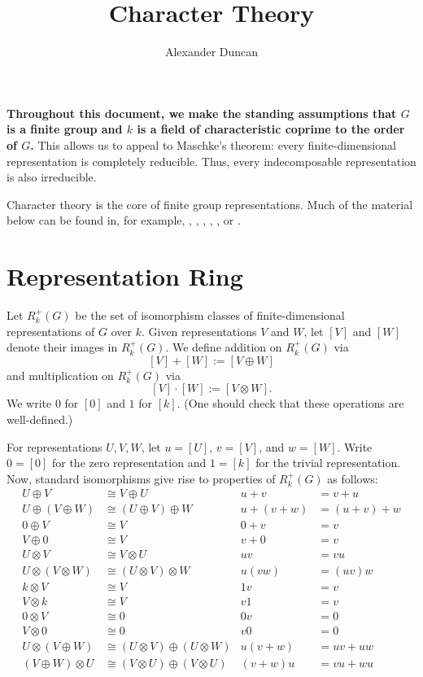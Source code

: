 \documentclass[12pt]{article}
\theoremstyle{plain}
\theoremstyle{definition}
\theoremstyle{remark}
\numberwithin{equation}{section}
\begin{document}
\title{Character Theory}
\author{Alexander Duncan}

\maketitle

{\bf
Throughout this document, we make the standing assumptions that $G$
is a finite group and $k$ is a field of characteristic coprime to the
order of $G$.}
This allows us to appeal to Maschke's theorem:
every finite-dimensional representation is completely reducible.
Thus, every indecomposable representation is also irreducible.

Character theory is the core of finite group representations.
Much of the material below can be found in, for example,
\cite[\S{14--15}]{AlperinBell},
\cite[\S{18.3}]{DF},
\cite[\S{4}]{Etingof},
\cite[\S{2}]{FultonHarris},
\cite[\S{XVIII.1--5}]{Lang}, or
\cite[\S{2}]{Serre}.

\section{Representation Ring}

Let $R^+_k(G)$ be the set of isomorphism classes of
finite-dimensional representations of $G$ over $k$.
Given representations $V$ and $W$, let $[V]$ and $[W]$ denote their
images in $R^+_k(G)$.
We define addition on $R^+_k(G)$ via
\[ [V] + [W] := [V \oplus W] \]
and multiplication on $R^+_k(G)$ via
\[ [V] \cdot [W] := [V \otimes W]. \]
We write $0$ for $[0]$ and $1$ for $[k]$.
(One should check that these operations are well-defined.)

For representations $U,V,W$, let $u=[U]$, $v=[V]$, and $w=[W]$.
Write $0 = [0]$ for the zero representation and $1=[k]$
for the trivial representation.
Now, standard isomorphisms give rise to properties of $R^+_k(G)$ as follows:
\begin{align*}
U \oplus V &\cong V \oplus U & u+v&=v+u\\
U \oplus (V \oplus W) &\cong (U \oplus V) \oplus W & u+(v+w)&=(u+v)+w\\
0 \oplus V &\cong V & 0+v&=v\\
V \oplus 0 &\cong V & v+0&=v\\
U \otimes V &\cong V \otimes U & uv&=vu\\
U \otimes (V \otimes W) &\cong (U \otimes V) \otimes W & u(vw)&=(uv)w\\
k \otimes V &\cong V & 1v&=v\\
V \otimes k &\cong V & v1&=v\\
0 \otimes V &\cong 0 & 0v&=0\\
V \otimes 0 &\cong 0 & v0&=0\\
U \otimes (V \oplus W) &\cong (U \otimes V) \oplus (U \otimes W) &
u(v+w)&=uv+uw\\
(V \oplus W) \otimes U &\cong (V \otimes U) \oplus (V \otimes U) &
(v+w)u&=vu+wu
\end{align*}
\end{document}

